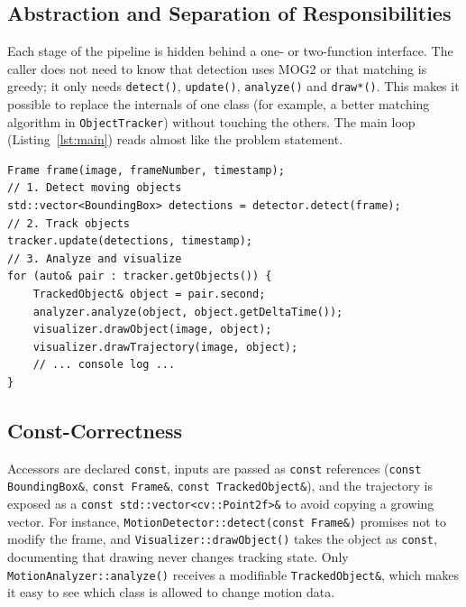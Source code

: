 \documentclass[12pt,a4paper,oneside]{book}
\begin{document}
\subsection{Abstraction and Separation of Responsibilities}
Each stage of the pipeline is hidden behind a one- or two-function interface. The caller does not need to know that detection uses MOG2 or that matching is greedy; it only needs \texttt{detect()}, \texttt{update()}, \texttt{analyze()} and \texttt{draw*()}. This makes it possible to replace the internals of one class (for example, a better matching algorithm in \texttt{ObjectTracker}) without touching the others. The main loop (Listing~\ref{lst:main}) reads almost like the problem statement.

\begin{minipage}{\linewidth}
\begin{lstlisting}[caption={Core of the main loop: each stage is a single call on a dedicated object.}, label={lst:main}]
Frame frame(image, frameNumber, timestamp);
// 1. Detect moving objects
std::vector<BoundingBox> detections = detector.detect(frame);
// 2. Track objects
tracker.update(detections, timestamp);
// 3. Analyze and visualize
for (auto& pair : tracker.getObjects()) {
    TrackedObject& object = pair.second;
    analyzer.analyze(object, object.getDeltaTime());
    visualizer.drawObject(image, object);
    visualizer.drawTrajectory(image, object);
    // ... console log ...
}
\end{lstlisting}
\end{minipage}

\subsection{Const-Correctness}
Accessors are declared \texttt{const}, inputs are passed as \texttt{const} references (\texttt{const BoundingBox\&}, \texttt{const Frame\&}, \texttt{const TrackedObject\&}), and the trajectory is exposed as a \texttt{const std::vector<cv::Point2f>\&} to avoid copying a growing vector. For instance, \texttt{MotionDetector::detect(const Frame\&)} promises not to modify the frame, and \texttt{Visualizer::drawObject()} takes the object as \texttt{const}, documenting that drawing never changes tracking state. Only \texttt{MotionAnalyzer::analyze()} receives a modifiable \texttt{TrackedObject\&}, which makes it easy to see which class is allowed to change motion data.
\end{document}
